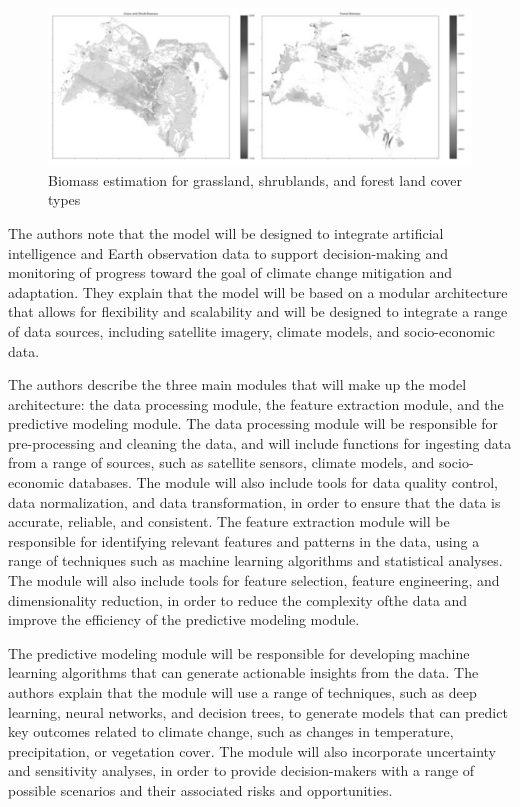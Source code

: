 \documentclass[draft, {\secondLanguage}, english]{volcanica-template}
\begin{document}
\begin{figure}[!t]								%
\centering
\includegraphics[width=\textwidth]{Images/fig1-3.png}
\caption{Biomass estimation for grassland, shrublands, and forest land cover types}	
\label{fig:01}									
\end{figure}

The authors note that the model will be designed to integrate artificial intelligence and Earth observation data to support decision-making and monitoring of progress toward the goal of climate change mitigation and adaptation. They explain that the model will be based on a modular architecture that allows for flexibility and scalability and will be designed to integrate a range of data sources, including satellite imagery, climate models, and socio-economic data.

The authors describe the three main modules that will make up the model architecture: the data processing module, the feature extraction module, and the predictive modeling module. The data processing module will be responsible for pre-processing and cleaning the data, and will include functions for ingesting data from a range of sources, such as satellite sensors, climate models, and socio-economic databases. The module will also include tools for data quality control, data normalization, and data transformation, in order to ensure that the data is accurate, reliable, and consistent. The feature extraction module will be responsible for identifying relevant features and patterns in the data, using a range of techniques such as machine learning algorithms and statistical analyses. The module will also include tools for feature selection, feature engineering, and dimensionality reduction, in order to reduce the complexity ofthe data and improve the efficiency of the predictive modeling module.

The predictive modeling module will be responsible for developing machine learning algorithms that can generate actionable insights from the data. The authors explain that the module will use a range of techniques, such as deep learning, neural networks, and decision trees, to generate models that can predict key outcomes related to climate change, such as changes in temperature, precipitation, or vegetation cover. The module will also incorporate uncertainty and sensitivity analyses, in order to provide decision-makers with a range of possible scenarios and their associated risks and opportunities.
\end{document}
